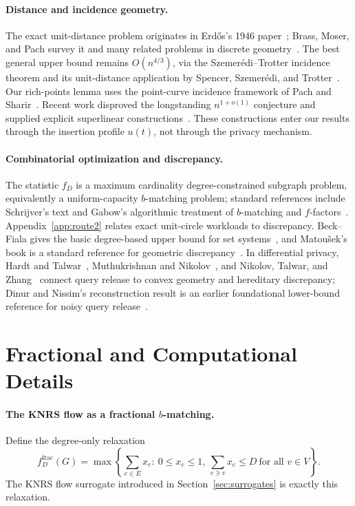\documentclass[11pt]{article}
\begin{document}
\paragraph{Distance and incidence geometry.}
The exact unit-distance problem originates in Erd\H{o}s's 1946 paper~\cite{Erdos46}; Brass, Moser, and Pach survey it and many related problems in discrete geometry~\cite{BrassMoserPach05}. The best general upper bound remains \(O(n^{4/3})\), via the Szemerédi--Trotter incidence theorem and its unit-distance application by Spencer, Szemerédi, and Trotter~\cite{SzemerediTrotter83,SpencerSzemerediTrotter84}. Our rich-points lemma uses the point-curve incidence framework of Pach and Sharir~\cite{PachSharir98}. Recent work disproved the longstanding \(n^{1+o(1)}\) conjecture and supplied explicit superlinear constructions~\cite{OpenAI2026,Remarks2026,Sawin2026,Emmerich2026}. These constructions enter our results through the insertion profile \(u(t)\), not through the privacy mechanism.

\paragraph{Combinatorial optimization and discrepancy.}
The statistic \(f_D\) is a maximum cardinality degree-constrained subgraph problem, equivalently a uniform-capacity \(b\)-matching problem; standard references include Schrijver's text and Gabow's algorithmic treatment of \(b\)-matching and \(f\)-factors~\cite{Schrijver03,Gabow18}. Appendix~\ref{app:route2} relates exact unit-circle workloads to discrepancy. Beck--Fiala gives the basic degree-based upper bound for set systems~\cite{BeckFiala81}, and Matoušek's book is a standard reference for geometric discrepancy~\cite{Matousek99}. In differential privacy, Hardt and Talwar~\cite{HT10}, Muthukrishnan and Nikolov~\cite{MN12}, and Nikolov, Talwar, and Zhang~\cite{NTZ13} connect query release to convex geometry and hereditary discrepancy; Dinur and Nissim's reconstruction result is an earlier foundational lower-bound reference for noisy query release~\cite{DinurNissim03}.



\section{Fractional and Computational Details}
\label{sec:extra-computation}

\paragraph{The KNRS flow as a fractional \(b\)-matching.}
Define the degree-only relaxation
\[
f_D^{\mathrm{frac}}(G)=
\max\left\{\sum_{e\in E}x_e:\ 0\le x_e\le 1,\ 
\sum_{e\ni v}x_e\le D\ \text{for all }v\in V\right\}.
\]
The KNRS flow surrogate introduced in Section~\ref{sec:surrogates} is exactly this relaxation.
\end{document}
